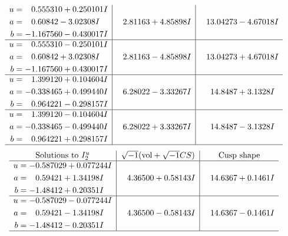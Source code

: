 \documentclass[1p]{elsarticle_modified}
\theoremstyle{definition}
\newcommand{\I}{\sqrt{-1}}
\begin{document}
$$\begin{array}{c|c|c}
\begin{aligned}
u &= \phantom{-}0.555310 + 0.250101 I \\
a &= \phantom{-}0.60842 - 3.02308 I \\
b &= -1.167560 - 0.430017 I\end{aligned}
 & \phantom{-}2.81163 + 4.85898 I & \phantom{-}13.04273 - 4.67018 I \\ \hline\begin{aligned}
u &= \phantom{-}0.555310 - 0.250101 I \\
a &= \phantom{-}0.60842 + 3.02308 I \\
b &= -1.167560 + 0.430017 I\end{aligned}
 & \phantom{-}2.81163 - 4.85898 I & \phantom{-}13.04273 + 4.67018 I \\ \hline\begin{aligned}
u &= \phantom{-}1.399120 + 0.104604 I \\
a &= -0.338465 + 0.499440 I \\
b &= \phantom{-}0.964221 - 0.298157 I\end{aligned}
 & \phantom{-}6.28022 - 3.33267 I & \phantom{-}14.8487 + 3.1328 I \\ \hline\begin{aligned}
u &= \phantom{-}1.399120 - 0.104604 I \\
a &= -0.338465 - 0.499440 I \\
b &= \phantom{-}0.964221 + 0.298157 I\end{aligned}
 & \phantom{-}6.28022 + 3.33267 I & \phantom{-}14.8487 - 3.1328 I\\
 \hline 
 \end{array}$$\newpage$$\begin{array}{c|c|c}  
\text{Solutions to }I^u_{2}& \I (\text{vol} + \sqrt{-1}CS) & \text{Cusp shape}\\
 \hline 
\begin{aligned}
u &= -0.587029 + 0.077244 I \\
a &= \phantom{-}0.59421 + 1.34198 I \\
b &= -1.48412 + 0.20351 I\end{aligned}
 & \phantom{-}4.36500 + 0.58143 I & \phantom{-}14.6367 + 0.1461 I \\ \hline\begin{aligned}
u &= -0.587029 - 0.077244 I \\
a &= \phantom{-}0.59421 - 1.34198 I \\
b &= -1.48412 - 0.20351 I\end{aligned}
 & \phantom{-}4.36500 - 0.58143 I & \phantom{-}14.6367 - 0.1461 I\\
 \hline 
 \end{array}$$\newpage
\end{document}
